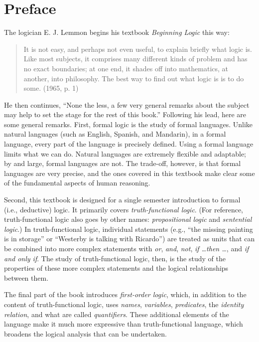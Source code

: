 \chapter{Preface}

The logician E. J. Lemmon begins his textbook \textit{Beginning Logic} this way:
\begin{quote}
It is not easy, and perhaps not even useful, to explain briefly what logic is. Like most subjects, it comprises many different kinds of problem and has no exact boundaries; at one end, it shades off into mathematics, at another, into philosophy. The best way to find out what logic is is to do some. (1965, p. 1)
\end{quote}
He then continues, ``None the less, a few very general remarks about the subject may help to set the stage for the rest of this book.'' Following his lead, here are some general remarks. First, formal logic is the study of formal languages. Unlike natural languages (such as English, Spanish, and Mandarin), in a formal language, every part of the language is precisely defined. Using a formal language limits what we can do. Natural languages are extremely flexible and adaptable; by and large, formal languages are not. The trade-off, however, is that formal languages are very precise, and the ones covered in this textbook make clear some of the fundamental aspects of human reasoning.

Second, this textbook is designed for a single semester introduction to formal (i.e., deductive) logic. It primarily covers \textit{truth-functional logic}. (For reference, truth-functional logic also goes by other names: \textit{propositional logic} and \textit{sentential logic}.) In truth-functional logic, individual statements (e.g., ``the missing painting is in storage'' or ``Westerby is talking with Ricardo'') are treated as units that can be combined into more complex statements with  \textit{or}, \textit{and}, \textit{not}, \textit{if \ldots then \ldots}, and \textit{if and only if}. The study of truth-functional logic, then, is the study of the properties of these more complex statements and the logical relationships between them. 

The final part of the book introduces \textit{first-order logic}, which, in addition to the content of truth-functional logic, uses \textit{names}, \textit{variables}, \textit{predicates}, the \textit{identity relation}, and what are called \textit{quantifiers}. These additional elements of the language make it much more expressive than truth-functional language, which broadens the logical analysis that can be undertaken. 

